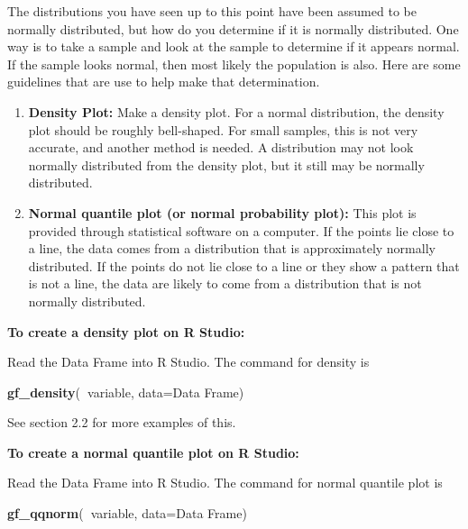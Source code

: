 \documentclass[
]{book}
\newenvironment{Shaded}{\begin{snugshade}}{\end{snugshade}}
\newcommand{\DataTypeTok}[1]{\textcolor[rgb]{0.13,0.29,0.53}{#1}}
\newcommand{\KeywordTok}[1]{\textcolor[rgb]{0.13,0.29,0.53}{\textbf{#1}}}
\newcommand{\NormalTok}[1]{#1}
\newcommand{\OperatorTok}[1]{\textcolor[rgb]{0.81,0.36,0.00}{\textbf{#1}}}
\begin{document}
The distributions you have seen up to this point have been assumed to be normally distributed, but how do you determine if it is normally distributed. One way is to take a sample and look at the sample to determine if it appears normal. If the sample looks normal, then most likely the population is also. Here are some guidelines that are use to help make that determination.

\begin{enumerate}
\def\labelenumi{\arabic{enumi}.}
\item
  \textbf{Density Plot:} Make a density plot. For a normal distribution, the density plot should be roughly bell-shaped. For small samples, this is not very accurate, and another method is needed. A distribution may not look normally distributed from the density plot, but it still may be normally distributed.
\item
  \textbf{Normal quantile plot (or normal probability plot):} This plot is provided through statistical software on a computer. If the points lie close to a line, the data comes from a distribution that is approximately normally distributed. If the points do not lie close to a line or they show a pattern that is not a line, the data are likely to come from a distribution that is not normally distributed.
\end{enumerate}

\textbf{To create a density plot on R Studio:}

Read the Data Frame into R Studio. The command for density is

\begin{Shaded}
\begin{Highlighting}[]
\KeywordTok{gf_density}\NormalTok{(}\OperatorTok{~}\NormalTok{variable, }\DataTypeTok{data=}\NormalTok{Data Frame)}
\end{Highlighting}
\end{Shaded}

See section 2.2 for more examples of this.

\textbf{To create a normal quantile plot on R Studio:}

Read the Data Frame into R Studio. The command for normal quantile plot is

\begin{Shaded}
\begin{Highlighting}[]
\KeywordTok{gf_qqnorm}\NormalTok{(}\OperatorTok{~}\NormalTok{variable, }\DataTypeTok{data=}\NormalTok{Data Frame)}
\end{Highlighting}
\end{Shaded}
\end{document}
